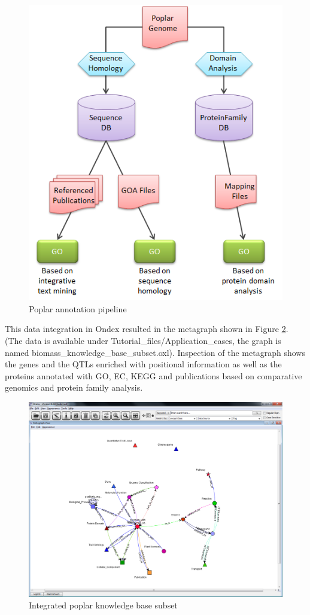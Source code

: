 \begin{figure}[H]
\centering
\includegraphics[scale=0.8]{images/Oct12/poplarkb_pipeline.png} 
\caption{Poplar annotation pipeline}
\label{fig:poplar_annotation_pipeline}
\end{figure}

This data integration in Ondex resulted in the metagraph shown in Figure \ref{fig:poplar_metagraph}.
(The data is available under Tutorial\_files/Application\_cases, the graph is named biomass\_knowledge\_base\_subset.oxl).
Inspection of the metagraph shows the genes and the QTLs enriched with positional information as well as
the proteins annotated with GO, EC, KEGG and publications based on comparative genomics and protein family analysis.
\begin{figure}[H]
\centering
\includegraphics[scale=0.35]{images/Oct12/poplarkb_metagraph.png} 
\caption{Integrated poplar knowledge base subset}
\label{fig:poplar_metagraph}
\end{figure}


